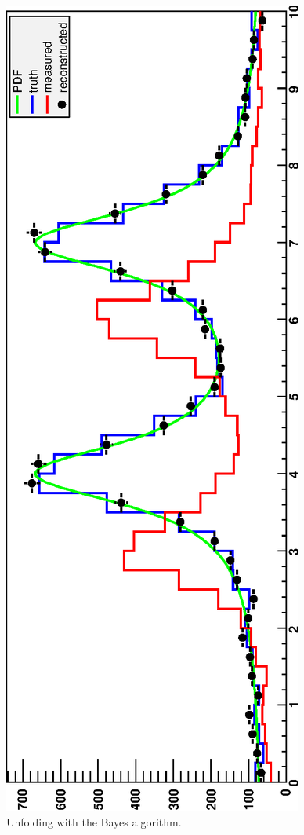 \documentclass{desyproc}
\begin{document}
\begin{figure}[hb]
\centerline{\includegraphics[angle=-90,width=\textwidth]{adye_tim.bayes2.eps}}
\caption{Unfolding with the Bayes algorithm.}\label{Fig:adye:bayes-example}
\end{figure}
\end{document}
